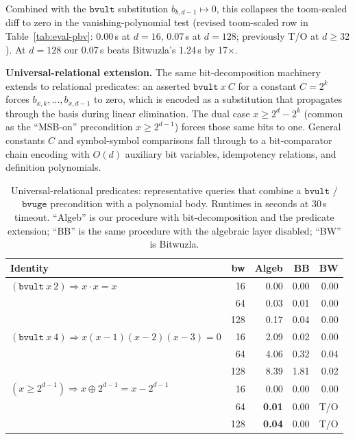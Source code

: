 \documentclass[runningheads]{llncs}
\begin{document}
Combined with the $\mathtt{bvult}$ substitution
$b_{b,d-1} \mapsto 0$, this collapses the toom-scaled diff to
zero in the vanishing-polynomial test (revised toom-scaled row
in Table~\ref{tab:eval-pbv}: 0.00\,s at $d{=}16$, 0.07\,s at
$d{=}128$; previously T/O at $d \geq 32$). At $d{=}128$ our
0.07\,s beats Bitwuzla's 1.24\,s by 17$\times$.

\textbf{Universal-relational extension.}
The same bit-decomposition machinery extends to relational
predicates: an asserted $\mathtt{bvult}\ x\ C$ for a constant
$C = 2^k$ forces $b_{x,k}, \ldots, b_{x,d-1}$ to zero, which is
encoded as a substitution that propagates through the basis
during linear elimination. The dual case $x \geq 2^d - 2^k$
(common as the ``MSB-on'' precondition $x \geq 2^{d-1}$) forces
those same bits to one. General constants $C$ and
symbol-symbol comparisons fall through to a bit-comparator
chain encoding with $O(d)$ auxiliary bit variables, idempotency
relations, and definition polynomials.

\begin{table}[h]
\caption{Universal-relational predicates: representative
queries that combine a $\mathtt{bvult}$ / $\mathtt{bvuge}$
precondition with a polynomial body. Runtimes in seconds at
30\,s timeout. ``Algeb'' is our procedure with bit-decomposition
and the predicate extension; ``BB'' is the same procedure with
the algebraic layer disabled; ``BW'' is Bitwuzla.}
\label{tab:eval-pbv-relational}
\centering
\begin{tabular}{lrrrr}
\toprule
Identity & bw & Algeb & BB & BW \\
\midrule
$(\mathtt{bvult}\ x\ 2) \Rightarrow x \cdot x = x$
                            & 16 & 0.00 & 0.00 & 0.00 \\
                            & 64 & 0.03 & 0.01 & 0.00 \\
                            & 128 & 0.17 & 0.04 & 0.00 \\
$(\mathtt{bvult}\ x\ 4) \Rightarrow x(x{-}1)(x{-}2)(x{-}3) = 0$
                            & 16 & 2.09 & 0.02 & 0.00 \\
                            & 64 & 4.06 & 0.32 & 0.04 \\
                            & 128 & 8.39 & 1.81 & 0.02 \\
$(x \geq 2^{d-1}) \Rightarrow x \oplus 2^{d-1} = x - 2^{d-1}$
                            & 16 & 0.00 & 0.00 & 0.00 \\
                            & 64 & \textbf{0.01} & 0.00 & T/O \\
                            & 128 & \textbf{0.04} & 0.00 & T/O \\
\bottomrule
\end{tabular}
\end{table}
\end{document}
